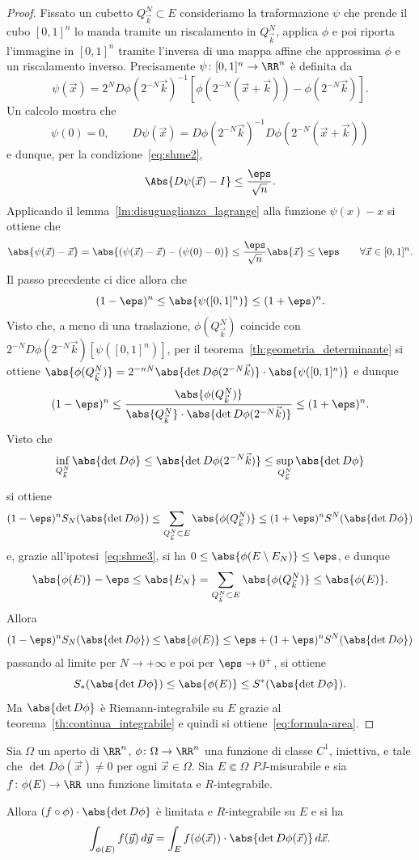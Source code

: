 \begin{proof}
Fissato un cubetto $Q^N_{\vec k}\subset E$ 
consideriamo la traformazione $\psi$ che prende 
il cubo $[0,1]^n$ lo manda tramite un riscalamento in $Q^N_{\vec k}$,
applica $\phi$ e poi riporta l'immagine in $[0,1]^n$
tramite l'inversa di una mappa affine che approssima $\phi$
e un riscalamento inverso.
Precisamente $\psi\colon[0,1]^n \to \RR^n$ è definita da
\[
\psi(\vec x) 
  = 2^N D\phi(2^{-N}\vec k)^{-1}[\phi(2^{-N}(\vec x + \vec k)) - \phi(2^{-N}\vec k)].
\]
Un calcolo mostra che 
\[
\psi(0) = 0, \qquad
D\psi(\vec x) = D\phi(2^{-N}\vec k)^{-1} D\phi(2^{-N}(\vec x + \vec k))
\]
e dunque, per la condizione~\eqref{eq:shme2},
\[
\Abs{D\psi(\vec x) - I} \le \frac{\eps}{\sqrt{n}}.
\]
Applicando il lemma~\ref{lm:disuguaglianza_lagrange} alla funzione $\psi(x)-x$ si ottiene che
\[
\abs{\psi(\vec x) - \vec x} 
= \abs{(\psi(\vec x) - \vec x)-(\psi(0)-0)}
\le \frac{\eps}{\sqrt n} \abs{\vec x}
\le \eps \qquad \forall \vec x \in [0,1]^n.
\]
Il passo precedente ci dice allora che 
\[
   (1-\eps)^n \le \abs{\psi([0,1]^n)} \le (1+\eps)^n.
\]
Visto che, a meno di una traslazione,
$\phi(Q^N_{\vec k})$ coincide con $2^{-N} D\phi(2^{-N}\vec k) [\psi([0,1]^n)]$,
per il teorema~\ref{th:geometria_determinante} si ottiene
$\abs{\phi(Q^N_{\vec k})} = 2^{-nN} \abs{\det D\phi(2^{-N}\vec k)} \cdot \abs{\psi([0,1]^n)}$
e dunque
\[
  (1-\eps)^n 
  \le \frac{\abs{\phi(Q^N_{\vec k})}}{\abs{Q^N_{\vec k}}\cdot \abs{\det D\phi(2^{-N}\vec k)}}
  \le (1+\eps)^n.
\]
Visto che 
\[
  \inf_{Q^N_{\vec k}} \abs{\det D\phi} 
    \le \abs{\det D\phi(2^{-N}\vec k)} 
    \le \sup_{Q^N_{\vec k}} \abs{\det D\phi}
\]
si ottiene 
\[
  (1-\eps)^n S_N(\abs{\det D\phi})
  \le \sum_{Q^N_{\vec k}\subset E} \abs{\phi(Q^N_{\vec k})}
  \le (1+\eps)^n S^N(\abs{\det D\phi})
\]
e, grazie all'ipotesi~\eqref{eq:shme3}, si ha 
$0\le \abs{\phi(E\setminus E_N)} \le \eps$,
e dunque
\[
  \abs{\phi(E)} - \eps 
  \le \abs{E_N} 
  = \sum_{Q^N_{\vec k}\subset E} \abs{\phi(Q^N_{\vec k})} 
  \le \abs{\phi(E)}.
\]
Allora
\[
(1-\eps)^n S_N(\abs{\det D\phi}) 
\le \abs{\phi(E)} 
\le \eps + (1+\eps)^n S^N(\abs{\det D\phi})
\]
passando al limite per $N\to +\infty$ e poi per $\eps\to 0^+$, 
si ottiene
\[
  S_*(\abs{\det D\phi}) \le \abs{\phi(E)} \le S^*(\abs{\det D\phi}).
\]
Ma $\abs{\det D\phi}$ è Riemann-integrabile su $E$ 
grazie al teorema~\ref{th:continua_integrabile} e quindi
si ottiene~\eqref{eq:formula-area}.
\end{proof}

\begin{theorem}
\label{th:cambio_variabile}
Sia $\Omega$ un aperto di $\RR^n$, 
$\phi\colon \Omega \to \RR^n$ una funzione di classe $C^1$, iniettiva, 
e tale che $\det D \phi(\vec x)\neq 0$ per ogni $\vec x\in \Omega$.
Sia $E \Subset \Omega$  $PJ$-misurabile e sia $f\colon \phi(E) \to \RR$ una funzione limitata 
e $R$-integrabile.

Allora $(f\circ \phi)\cdot \abs{\det D\phi}$ è limitata e $R$-integrabile su $E$ 
e si ha
\begin{equation}
  \label{eq:cambio-variabile}
  \int_{\phi(E)} f (\vec y)\, d\vec y 
  = \int_E f(\phi(\vec x)) \cdot \abs{\det D\phi(\vec x)}\, d\vec x.
\end{equation}
\end{theorem}

